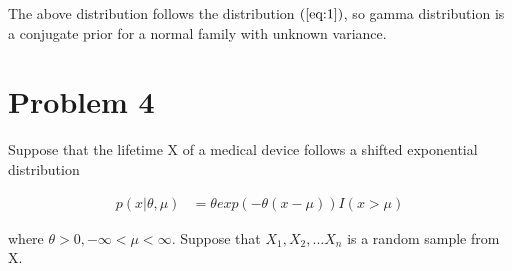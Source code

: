 \begin{itemize}
The above distribution follows the distribution $(\ref{eq:1})$, so gamma distribution is a conjugate prior for a normal family with unknown variance.

\end{itemize}

\section{Problem 4}
Suppose that the lifetime X of a medical device follows a shifted exponential distribution

\begin{align*}
	p(x|\theta, \mu) &= \theta exp(-\theta (x-\mu)) I(x> \mu)
\end{align*}

where $\theta > 0, -\infty < \mu < \infty$. Suppose that $X_1, X_2, ... X_n$ is a random sample from X.

